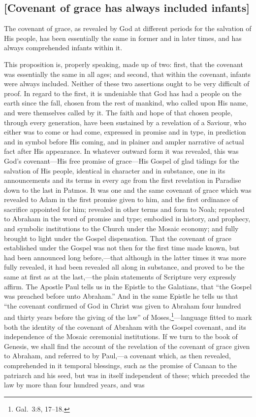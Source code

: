 \documentclass[
]{book}
\begin{document}
\hypertarget{covenant-of-grace-has-always-included-infants}{%
\subsection{{[}Covenant of grace has always included infants{]}}\label{covenant-of-grace-has-always-included-infants}}

The covenant of grace, as revealed by God at different periods for the salvation of His people, has been essentially the same in former and in later times, and has always comprehended infants within it.

This proposition is, properly speaking, made up of two: first, that the covenant was essentially the same in all ages; and second, that within the covenant, infants were always included. Neither of these two assertions ought to be very difficult of proof. In regard to the first, it is undeniable that God has had a people on the earth since the fall, chosen from the rest of mankind, who called upon His name, and were themselves called by it. The faith and hope of that chosen people, through every generation, have been sustained by a revelation of a Saviour, who either was to come or had come, expressed in promise and in type, in prediction and in symbol before His coming, and in plainer and ampler narrative of actual fact after His appearance. In whatever outward form it was revealed, this was God's covenant---His free promise of grace---His Gospel of glad tidings for the salvation of His people, identical in character and in substance, one in its announcements and its terms in every age from the first revelation in Paradise down to the last in Patmos. It was one and the same covenant of grace which was revealed to Adam in the first promise given to him, and the first ordinance of sacrifice appointed for him; revealed in other terms and form to Noah; repeated to Abraham in the word of promise and type; embodied in history, and prophecy, and symbolic institutions to the Church under the Mosaic economy; and fully brought to light under the Gospel dispensation. That the covenant of grace established under the Gospel was not then for the first time made known, but had been announced long before,---that although in the latter times it was more fully revealed, it had been revealed all along in substance, and proved to be the same at first as at the last,---the plain statements of Scripture very expressly affirm. The Apostle Paul tells us in the Epistle to the Galatians, that ``the Gospel was preached before unto Abraham.'' And in the same Epistle he tells us that ``the covenant confirmed of God in Christ was given to Abraham four hundred and thirty years before the giving of the law'' of Moses,\footnote{Gal.~3:8, 17--18.}---language fitted to mark both the identity of the covenant of Abraham with the Gospel covenant, and its independence of the Mosaic ceremonial institutions. If we turn to the book of Genesis, we shall find the account of the revelation of the covenant of grace given to Abraham, and referred to by Paul,---a covenant which, as then revealed, comprehended in it temporal blessings, such as the promise of Canaan to the patriarch and his seed, but was in itself independent of these; which preceded the law by more than four hundred years, and was 
\end{document}
